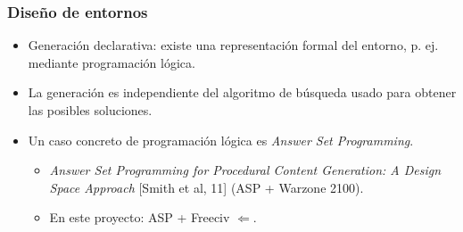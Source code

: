 \begin{frame}
\frametitle{Diseño de entornos}

	\begin{itemize}
		\item<1-> \textcolor{UDCpink}{Generación declarativa}: existe una representación formal del entorno, p. ej. mediante \textcolor{UDCpink}{programación lógica}.
		
		\vspace{1em}
		
		\item<2-> La generación es \textcolor{UDCpink}{independiente} del algoritmo de búsqueda usado para obtener las posibles soluciones.
		
		\vspace{1em}
		
		\item<3-> Un caso concreto de programación lógica es \textcolor{UDCpink}{\textit{Answer Set Programming}}.
		
		\vspace{0.5em}
		
		\begin{itemize}
			\item<4-> \textit{Answer Set Programming for Procedural Content Generation: A Design Space Approach} \textcolor{UDCpink}{[Smith et al, 11]} (ASP + Warzone 2100).
			
			\vspace{0.5em}
			
			\item<5-> En este proyecto: \textcolor{UDCpink}{ASP + Freeciv} $\Leftarrow$.
		\end{itemize}
	\end{itemize}

\end{frame}